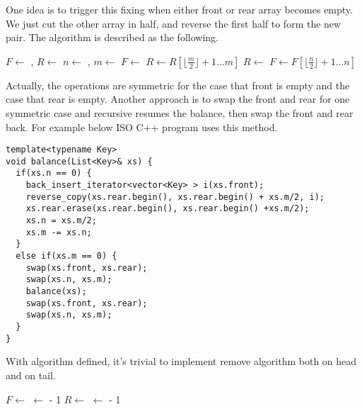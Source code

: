 \documentclass[UTF8]{article}
\begin{document}
One idea is to trigger this fixing when either front or rear array becomes empty. We just
cut the other array in half, and reverse the first half to form the new pair. The algorithm
is described as the following.

\begin{algorithmic}
  \State $F \gets$ , $R \gets$ 
  \State $n \gets$ , $m \gets$ 
    \State $F \gets$ 
    \State $R \gets R[\lfloor \frac{m}{2} \rfloor + 1 ... m]$
    \State $R \gets$ 
    \State $F \gets F[\lfloor \frac{n}{2} \rfloor + 1 ... n]$
  \EndIf
\EndFunction
\end{algorithmic}

Actually, the operations are symmetric for the case that front is empty and the case that
rear is empty. Another approach is to swap the front and rear for one symmetric case
and recursive resumes the balance, then swap the front and rear back. For example
below ISO C++ program uses this method.

\begin{lstlisting}
template<typename Key>
void balance(List<Key>& xs) {
  if(xs.n == 0) {
    back_insert_iterator<vector<Key> > i(xs.front);
    reverse_copy(xs.rear.begin(), xs.rear.begin() + xs.m/2, i);
    xs.rear.erase(xs.rear.begin(), xs.rear.begin() +xs.m/2);
    xs.n = xs.m/2;
    xs.m -= xs.n;
  }
  else if(xs.m == 0) {
    swap(xs.front, xs.rear);
    swap(xs.n, xs.m);
    balance(xs);
    swap(xs.front, xs.rear);
    swap(xs.n, xs.m);
  }
}
\end{lstlisting}

With  algorithm defined, it's trivial to implement remove algorithm
both on head and on tail.

\begin{algorithmic}
  \State {}
  \State $F \gets $ 
    \State {}
  \Else
    \State {} $\gets $  - 1
  \EndIf
\EndFunction
\Statex
{}
  \State {}
  \State $R \gets $ 
    \State {}
  \Else
    \State {} $\gets $  - 1
  \EndIf
\EndFunction
\end{algorithmic}
\end{document}
